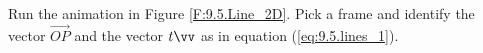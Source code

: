 \begin{activity} \label{A:9.5.1} Run the animation in Figure \ref{F:9.5.Line_2D}. Pick a frame and identify the vector $\overrightarrow{OP}$ and the vector $t \vv$ as in equation (\ref{eq:9.5.lines_1}).


\end{activity}
\begin{smallhint}

\end{smallhint}
\begin{bighint}

\end{bighint}
\begin{activitySolution}

\end{activitySolution}
\aftera
